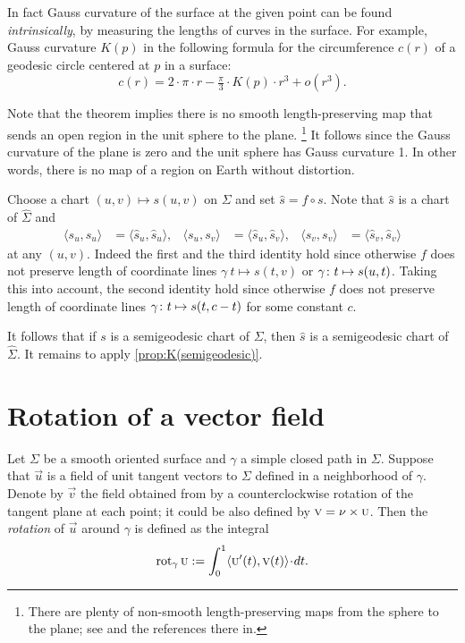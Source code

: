 In fact Gauss curvature of the surface at the given point can be found {}\emph{intrinsically},
by measuring the lengths of curves in the surface.
For example, Gauss curvature $K(p)$ in the following formula for the circumference $c(r)$ of a geodesic circle centered at $p$ in a surface: 
\[c(r)=2\cdot\pi\cdot r-\tfrac\pi3\cdot K(p)\cdot r^3+o(r^3).\]

Note that the theorem implies there is no smooth length-preserving map that sends an open region in the unit sphere to the plane.%
\footnote{There are plenty of non-smooth length-preserving maps from the sphere to the plane; see \cite{petrunin-yashinski} and the references there in.}
It follows since the Gauss curvature of the plane is zero and the unit sphere has Gauss curvature 1. 
In other words, there is no map of a region on Earth without distortion.

 Choose a chart $(u,v)\mapsto s(u,v)$ on $\Sigma$ and set
$\hat s =f\circ s$.
Note that $\hat s$ is a chart of $\hat{\Sigma}$ and 
\begin{align*}
\langle s_u,s_u\rangle
&=
\langle \hat s_u, \hat s_u\rangle,
&
\langle s_u, s_v\rangle
&=
\langle \hat s_u, \hat s_v\rangle,
&
\langle s_v, s_v\rangle
&=
\langle \hat s_v, \hat s_v\rangle
\end{align*}
at any $(u,v)$.
Indeed the first and the third identity hold since otherwise $f$ does not preserve length of coordinate lines $\gamma\:t\mapsto s(t,v)$ or  $\gamma\:t\z\mapsto s(u,t)$.
Taking this into account, the second identity hold since otherwise $f$ does not preserve length of coordinate lines $\gamma\:t\z\mapsto s(t,c-t)$ for some constant $c$.

It follows that if $s$ is a semigeodesic chart of $\Sigma$,
then $\hat s$ is a semigeodesic chart of $\hat{\Sigma}$.
It remains to apply \ref{prop:K(semigeodesic)}.
\qeds

\section{Rotation of a vector field}

Let $\Sigma$ be a smooth oriented surface and $\gamma$ a simple closed path in $\Sigma$.
Suppose that $\vec u$ is a field of unit tangent vectors to $\Sigma$ defined in a neighborhood of $\gamma$.
Denote by $\vec v$ the field obtained from by a counterclockwise rotation of the tangent plane at each point; it could be also defined by $\textsc v=\nu\times\textsc u$.
Then the \emph{rotation} of $\vec u$ around $\gamma$ is defined as the integral
\[\rot_\gamma\vec u
\df
\int_0^1\langle\vec u'(t),\vec v(t)\rangle\cdot dt.\]

